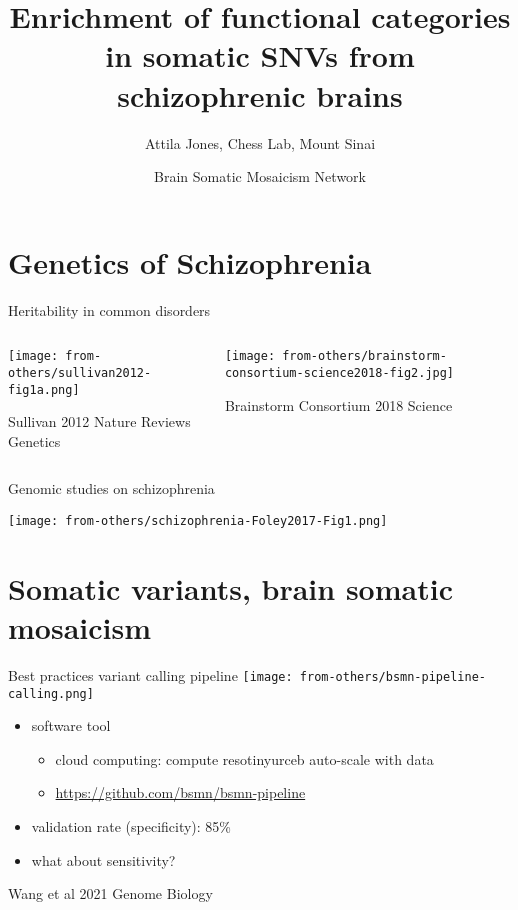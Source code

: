 \documentclass[usenames,dvipsnames]{beamer}
\title{Enrichment of functional categories in somatic SNVs from schizophrenic
brains}
\author{Attila Jones, Chess Lab, Mount Sinai}
\date{Brain Somatic Mosaicism Network}
\begin{document}
\maketitle

\section{Genetics of Schizophrenia}

\begin{frame}{Heritability in common disorders}
\begin{columns}[t]
\begin{column}{0.4\textwidth}

\texttt{[image: from-others/sullivan2012-fig1a.png]}

{\tiny Sullivan 2012 Nature Reviews Genetics}
\end{column}

\begin{column}{0.6\textwidth}

\texttt{[image: from-others/brainstorm-consortium-science2018-fig2.jpg]}

{\tiny Brainstorm Consortium 2018 Science}
\end{column}
\end{columns}
\end{frame}

\begin{frame}{Genomic studies on schizophrenia}
\begin{center}
\texttt{[image: from-others/schizophrenia-Foley2017-Fig1.png]}
\end{center}
\end{frame}

\section{Somatic variants, brain somatic mosaicism}

\begin{frame}{Best practices variant calling pipeline}
\texttt{[image: from-others/bsmn-pipeline-calling.png]}
\begin{center}
\begin{itemize}
\item software tool
\begin{itemize}
        \item cloud computing: compute resotinyurceb auto-scale with data
	\item  \url{https://github.com/bsmn/bsmn-pipeline}
\end{itemize}
\item validation rate (specificity): 85\%
\item what about sensitivity?
\end{itemize}
\end{center}

{\tiny Wang et al 2021 Genome Biology}
\end{frame}
\end{document}

